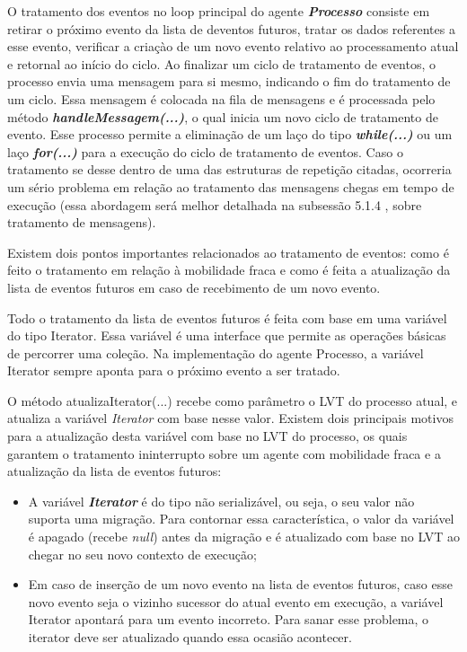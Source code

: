 O tratamento dos eventos no loop principal do agente \textit{\textbf{Processo}} consiste em retirar o próximo evento da lista de deventos futuros, tratar os dados referentes a esse evento, verificar a criaçào de um novo evento relativo ao processamento atual e retornal ao início do ciclo. Ao finalizar um ciclo de tratamento de eventos, o processo envia uma mensagem para si mesmo, indicando o fim do tratamento de um ciclo. Essa mensagem é colocada na fila de mensagens e é processada pelo método \textit{\textbf{handleMessagem(...)}}, o qual inicia um novo ciclo de tratamento de evento. Esse processo permite a eliminação de um laço do tipo \textit{\textbf{while(...)}} ou um laço \textit{\textbf{for(...)}} para a execução do ciclo de tratamento de eventos. Caso o tratamento se desse dentro de uma das estruturas de repetição citadas, ocorreria um sério problema em relação ao tratamento das mensagens chegas em tempo de execução (essa abordagem será melhor detalhada na subsessão 5.1.4 , sobre tratamento de mensagens).


Existem dois pontos importantes relacionados ao tratamento de eventos: como é feito o tratamento em relação à mobilidade fraca e como é feita a atualização da lista de eventos futuros em caso de recebimento de um novo evento.

Todo o tratamento da lista de eventos futuros é feita com base em uma variável do tipo Iterator. Essa variável é uma interface que permite as operações básicas de percorrer uma coleção. Na implementação do agente Processo, a variável Iterator sempre aponta para o próximo evento a ser tratado.

O método atualizaIterator(...) recebe como parâmetro o LVT do processo atual, e atualiza a variável \textit{Iterator} com base nesse valor. Existem dois principais motivos para a atualização desta variável com base no LVT do processo, os quais garantem o tratamento ininterrupto sobre um agente com mobilidade fraca e a atualização da lista de eventos futuros:

\begin{itemize}
	\item A variável \textit{\textbf{Iterator}} é do tipo não serializável, ou seja, o seu valor não suporta uma migração. Para contornar essa característica, o valor da variável é apagado (recebe \textit{null}) antes da migração e é atualizado com base no LVT ao chegar no seu novo contexto de execução;

	\item Em caso de inserção de um novo evento na lista de eventos futuros, caso esse novo evento seja o vizinho sucessor do atual evento em execução, a variável Iterator apontará para um evento incorreto. Para sanar esse problema, o iterator deve ser atualizado quando essa ocasião acontecer.
\end{itemize}

